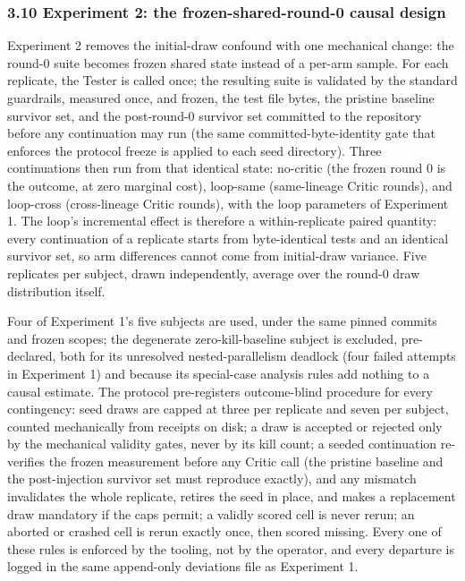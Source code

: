 \documentclass[
  11pt,
]{article}
\begin{document}
\subsubsection{3.10 Experiment 2: the frozen-shared-round-0 causal
design}\label{experiment-2-the-frozen-shared-round-0-causal-design}

Experiment 2 removes the initial-draw confound with one mechanical
change: the round-0 suite becomes frozen shared state instead of a
per-arm sample. For each replicate, the Tester is called once; the
resulting suite is validated by the standard guardrails, measured once,
and frozen, the test file bytes, the pristine baseline survivor set, and
the post-round-0 survivor set committed to the repository before any
continuation may run (the same committed-byte-identity gate that
enforces the protocol freeze is applied to each seed directory). Three
continuations then run from that identical state: no-critic (the frozen
round 0 is the outcome, at zero marginal cost), loop-same (same-lineage
Critic rounds), and loop-cross (cross-lineage Critic rounds), with the
loop parameters of Experiment 1. The loop's incremental effect is
therefore a within-replicate paired quantity: every continuation of a
replicate starts from byte-identical tests and an identical survivor
set, so arm differences cannot come from initial-draw variance. Five
replicates per subject, drawn independently, average over the round-0
draw distribution itself.

Four of Experiment 1's five subjects are used, under the same pinned
commits and frozen scopes; the degenerate zero-kill-baseline subject is
excluded, pre-declared, both for its unresolved nested-parallelism
deadlock (four failed attempts in Experiment 1) and because its
special-case analysis rules add nothing to a causal estimate. The
protocol pre-registers outcome-blind procedure for every contingency:
seed draws are capped at three per replicate and seven per subject,
counted mechanically from receipts on disk; a draw is accepted or
rejected only by the mechanical validity gates, never by its kill count;
a seeded continuation re-verifies the frozen measurement before any
Critic call (the pristine baseline and the post-injection survivor set
must reproduce exactly), and any mismatch invalidates the whole
replicate, retires the seed in place, and makes a replacement draw
mandatory if the caps permit; a validly scored cell is never rerun; an
aborted or crashed cell is rerun exactly once, then scored missing.
Every one of these rules is enforced by the tooling, not by the
operator, and every departure is logged in the same append-only
deviations file as Experiment 1.
\end{document}
